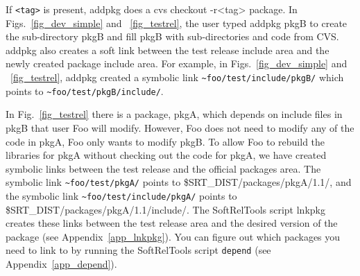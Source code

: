 \documentclass[12pt]{article}
\begin{document}
\begin{itemize}
If \texttt{<tag>} is present, {\ttfamily addpkg} does a 
{\ttfamily cvs checkout -r<tag> package}.  
 In
Figs.~\ref{fig_dev_simple} and ~\ref{fig_testrel}, the user typed 
{\ttfamily addpkg pkgB} 
to create the sub-directory {\ttfamily pkgB} and fill
{\ttfamily pkgB} with sub-directories and code from CVS. {\ttfamily addpkg} 
also creates a soft link between the test release include area and the newly 
created package include area.  For example, in 
Figs.~\ref{fig_dev_simple} and ~\ref{fig_testrel}, {\ttfamily addpkg}
created a symbolic link \verb|~foo/test/include/pkgB/| which points to
\verb|~foo/test/pkgB/include/|. 

In Fig.~\ref{fig_testrel} there is a package, {\ttfamily pkgA}, which 
depends on include files in {\ttfamily pkgB} that user Foo will modify.  
However, Foo does not need to modify any of the code in {\ttfamily pkgA}, 
Foo only wants to modify {\ttfamily pkgB}.  To allow Foo to rebuild the 
libraries for {\ttfamily pkgA} without checking out the code for {\ttfamily
pkgA}, we have created symbolic links between the test release and the
official packages area.  The symbolic link \verb|~foo/test/pkgA/| points to 
\$SRT\_DIST/packages/pkgA/1.1/, and the symbolic link 
\verb|~foo/test/include/pkgA/| points to \$SRT\_DIST/packages/pkgA/1.1/include/.  
The SoftRelTools script {\ttfamily lnkpkg} 
creates these 
links between the test release area and the desired version of the package
(see Appendix~\ref{app_lnkpkg}). You can figure out which packages you need
to link to by running the SoftRelTools script \texttt{depend} 
(see Appendix~\ref{app_depend}).      



\end{itemize}
\end{document}
